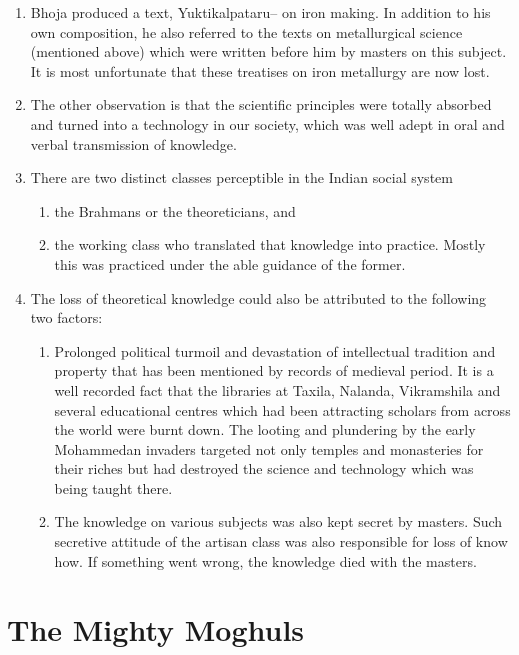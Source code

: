 \begin{enumerate}
\item Bhoja produced a text, Yuktikalpataru– on iron making. In addition to his own composition, he also referred to the texts on metallurgical science (mentioned above) which were written before him by masters on this subject. It is most unfortunate that these treatises on iron metallurgy are now lost.
\item The other observation is that the scientific principles were totally absorbed and turned into a technology in our society, which was well adept in oral and verbal transmission of knowledge.
\item There are two distinct classes perceptible in the Indian social system 
\begin{enumerate}
\item the Brahmans or the theoreticians, and 
\item the working class who translated that knowledge into practice. Mostly this was practiced under the able guidance of the former.
\end{enumerate}
\item The loss of theoretical knowledge could also be attributed to the following two factors:
\begin{enumerate}
\item Prolonged political turmoil and devastation of intellectual tradition and property that has been mentioned by records of medieval period. It is a well recorded fact that the libraries at Taxila, Nalanda, Vikramshila and several educational centres which had been attracting scholars from across the world were burnt down. The looting and plundering by the early Mohammedan invaders targeted not only temples and monasteries for their riches but had destroyed the science and technology which was being taught there.
\item The knowledge on various subjects was also kept secret by masters. Such secretive attitude of the artisan class was also responsible for loss of know how. If something went wrong, the knowledge died with the masters. 
\end{enumerate}
\end{enumerate}

\section*{The Mighty Moghuls}\label{chapter5-section-2}

